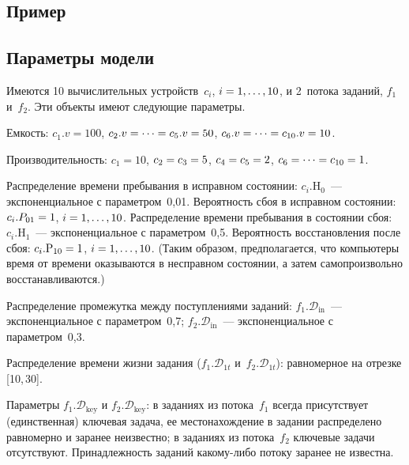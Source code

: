 \begin{multicols}{2}
\vspace*{-6pt}

\section{Пример}

\vspace*{-3pt}

\subsection{Параметры модели}

    Имеются 10 вычислительных устройств~$c_i$, $i\hm=1,\ldots , 10$, и 
2~потока заданий, $f_1$ и~$f_2$. Эти объекты имеют следующие параметры.
    
    Емкость: $c_1.v=100$, $c_2.v=\cdots =c_5.v\hm=50$, $c_6.v\hm=\cdots = 
c_{10}.v\hm=10$.
    
    Производительность: $c_1=10$, $c_2\hm=c_3\hm=5$, $c_4\hm=c_5\hm=2$, 
$c_6\hm=\cdots = c_{10}\hm=1$.
    
    Распределение времени пребывания в исправном состоянии: 
    $c_i.\mathrm{H}_0$~--- экспоненциальное с параметром~0,01. Вероятность сбоя в 
исправном состоянии: $c_i.P_{01}\hm=1$, $i\hm=1,\ldots , 10$. Распределение 
времени пребывания в состоянии сбоя: $c_i.\mathrm{H}_1$~--- экспоненциальное с 
параметром~0,5. Вероятность восстановления после сбоя: 
$c_i.\mathrm{P}_{10}\hm=1$, $i\hm=1,\ldots , 10$. (Таким образом, предполагается, что 
компьютеры время от времени оказываются в несправном состоянии, а 
затем самопроизвольно восстанавливаются.)
    
    Распределение промежутка между поступлениями заданий: 
$f_1.\mathcal{D}_{\mathrm{in}}$~--- экспоненциальное с па\-ра\-мет\-ром~0,7; 
$f_2.\mathcal{D}_{\mathrm{in}}$~--- экспоненциальное с па\-ра\-мет\-ром~0,3.
    
    Распределение времени жизни задания ($f_1.\mathcal{D}_{1t}$ 
и~$f_2.\mathcal{D}_{1t}$): равномерное на отрезке [10,\,30].
    
    Параметры $f_1.\mathcal{D}_{\mathrm{key}}$ и $f_2.\mathcal{D}_{\mathrm{key}}$: в заданиях 
из потока~$f_1$ всегда присутствует (единственная) ключевая задача, ее 
местонахождение в задании распределено равномерно и заранее неизвестно; 
в заданиях из потока~$f_2$ ключевые задачи отсутствуют. Принадлежность 
заданий какому-либо потоку заранее не известна.

    \begin{table*}[b]\small
    \begin{center}
    \vspace*{2ex}
    

\end{center}
\end{table*}
\end{multicols}
